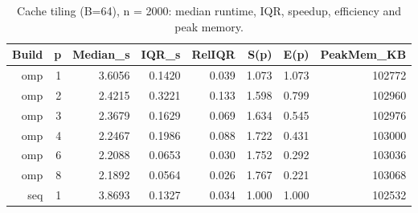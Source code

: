 \begin{table}[ht]
\centering
\small
\begin{tabular}{rrrrrrrr}
\hline
Build & p & Median\_s & IQR\_s & RelIQR & S(p) & E(p) & PeakMem\_KB \\
\hline
omp & 1 & 3.6056 & 0.1420 & 0.039 & 1.073 & 1.073 & 102772 \\
omp & 2 & 2.4215 & 0.3221 & 0.133 & 1.598 & 0.799 & 102960 \\
omp & 3 & 2.3679 & 0.1629 & 0.069 & 1.634 & 0.545 & 102976 \\
omp & 4 & 2.2467 & 0.1986 & 0.088 & 1.722 & 0.431 & 103000 \\
omp & 6 & 2.2088 & 0.0653 & 0.030 & 1.752 & 0.292 & 103036 \\
omp & 8 & 2.1892 & 0.0564 & 0.026 & 1.767 & 0.221 & 103068 \\
seq & 1 & 3.8693 & 0.1327 & 0.034 & 1.000 & 1.000 & 102532 \\
\hline
\end{tabular}
\caption{Cache tiling (B=64), n = 2000: median runtime, IQR, speedup, efficiency and peak memory.}
\label{tab:results_tile_n2000}
\end{table}
